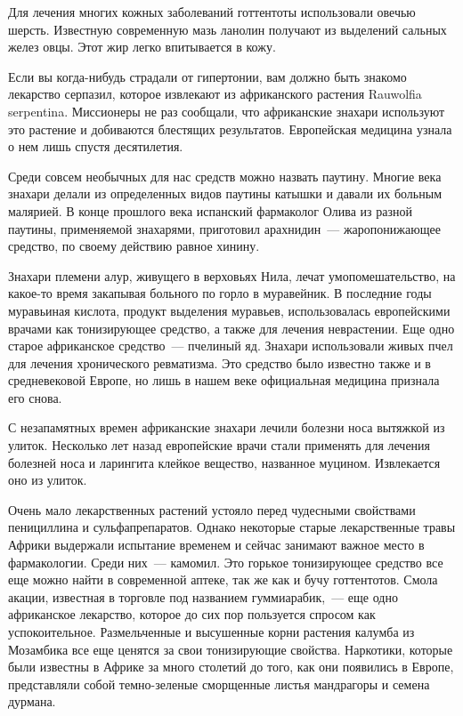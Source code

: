 \documentclass[12pt,a4paper,twoside,openany,svgnames]{memoir}
\begin{document}
Для лечения многих кожных заболеваний готтентоты использовали овечью шерсть. Известную современную мазь ланолин получают из выделений сальных желез овцы. Этот жир легко впитывается в кожу.

Если вы когда-нибудь страдали от гипертонии, вам должно быть знакомо лекарство серпазил, которое извлекают из африканского растения Rauwolfia serpentina. Миссионеры не раз сообщали, что африканские знахари используют это растение и добиваются блестящих результатов. Европейская медицина узнала о нем лишь спустя десятилетия.

Среди совсем необычных для нас средств можно назвать паутину. Многие века знахари делали из определенных видов паутины катышки и давали их больным малярией. В конце прошлого века испанский фармаколог Олива из разной паутины, применяемой знахарями, приготовил арахнидин~--- жаропонижающее средство, по своему действию равное хинину.

Знахари племени алур, живущего в верховьях Нила, лечат умопомешательство, на какое-то время закапывая больного по горло в муравейник. В последние годы муравьиная кислота, продукт выделения муравьев, использовалась европейскими врачами как тонизирующее средство, а также для лечения неврастении. Еще одно старое африканское средство~--- пчелиный яд. Знахари использовали живых пчел для лечения хронического ревматизма. Это средство было известно также и в средневековой Европе, но лишь в нашем веке официальная медицина признала его снова.

С незапамятных времен африканские знахари лечили болезни носа вытяжкой из улиток. Несколько лет назад европейские врачи стали применять для лечения болезней носа и ларингита клейкое вещество, названное муцином. Извлекается оно из улиток.

Очень мало лекарственных растений устояло перед чудесными свойствами пенициллина и сульфапрепаратов. Однако некоторые старые лекарственные травы Африки выдержали испытание временем и сейчас занимают важное место в фармакологии. Среди них~--- камомил. Это горькое тонизирующее средство все еще можно найти в современной аптеке, так же как и бучу готтентотов. Смола акации, известная в торговле под названием гуммиарабик,~--- еще одно африканское лекарство, которое до сих пор пользуется спросом как успокоительное. Размельченные и высушенные корни растения калумба из Мозамбика все еще ценятся за свои тонизирующие свойства. Наркотики, которые были известны в Африке за много столетий до того, как они появились в Европе, представляли собой темно-зеленые сморщенные листья мандрагоры и семена дурмана.
\end{document}
